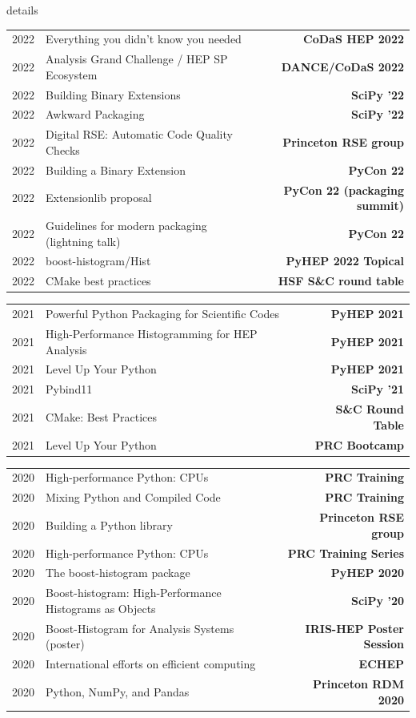\documentclass[10pt,letterpaper]{moderncv}
\begin{document}
\begin{taggedblock}{details}
\begin{tabularx}{\textwidth}{p{.33in}X>{\bfseries}r}
    2022 & Everything you didn't know you needed & CoDaS HEP 2022 \\
    2022 & Analysis Grand Challenge / HEP SP Ecosystem & DANCE/CoDaS 2022 \\
    2022 & Building Binary Extensions & SciPy '22 \\
    2022 & Awkward Packaging & SciPy '22 \\
    2022 & Digital RSE: Automatic Code Quality Checks & Princeton RSE group \\
    2022 & Building a Binary Extension & PyCon 22 \\
    2022 & Extensionlib proposal & PyCon 22 (packaging summit) \\
    2022 & Guidelines for modern packaging (lightning talk) & PyCon 22 \\
    2022 & boost-histogram/Hist & PyHEP 2022 Topical \\
    2022 & CMake best practices & HSF S\&C round table \\
\end{tabularx}

\begin{tabularx}{\textwidth}{p{.33in}X>{\bfseries}r}
    2021 & Powerful Python Packaging for Scientific Codes & PyHEP 2021 \\
    2021 & High-Performance Histogramming for HEP Analysis & PyHEP 2021 \\
    2021 & Level Up Your Python & PyHEP 2021 \\
    2021 & Pybind11 & SciPy '21 \\
    2021 & CMake: Best Practices & S\&C Round Table \\
    2021 & Level Up Your Python & PRC Bootcamp \\
\end{tabularx}

\begin{tabularx}{\textwidth}{p{.33in}X>{\bfseries}r}
    2020 & High-performance Python: CPUs & PRC Training \\
    2020 & Mixing Python and Compiled Code & PRC Training \\
    2020 & Building a Python library & Princeton RSE group \\
    2020 & High-performance Python: CPUs & PRC Training Series \\
    2020 & The boost-histogram package & PyHEP 2020 \\
    2020 & Boost-histogram: High-Performance Histograms as Objects & SciPy '20 \\
    2020 & Boost-Histogram for Analysis Systems (poster) & IRIS-HEP Poster Session \\
    2020 & International efforts on efficient computing & ECHEP \\
    2020 & Python, NumPy, and Pandas & Princeton RDM 2020 \\
\end{tabularx}


\end{taggedblock}
\end{document}
